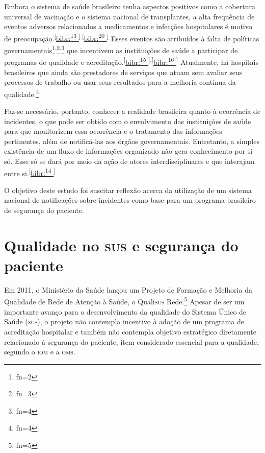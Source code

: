\documentclass{article}
\makeatletter
\newcommand{\fn}{\afterassignment\fn@aux\count0=}
\newcommand{\fn@aux}{\csname fn\the\count0\endcsname}
\makeatother
\begin{document}
Embora o sistema de saúde brasileiro tenha aspectos positivos como a cobertura
universal de
vacinação e o sistema nacional de transplantes, a alta frequência de eventos
adversos
relacionados a medicamentos e infecções hospitalares é motivo de preocupação.\textsuperscript{[}\hyperlink{\textsuperscript{13}
}{bibr:\textsuperscript{13}
}\textsuperscript{]}\textsuperscript{,}\textsuperscript{[}\hyperlink{\textsuperscript{20}
}{bibr:\textsuperscript{20}
}\textsuperscript{]}
Esses eventos são atribuídos à falta de políticas governamentais\footnote{\fn2}\textsuperscript{,}\footnote{\fn3}\textsuperscript{,}\footnote{\fn4}
que incentivem as instituições de saúde a participar de programas de qualidade e
acreditação.\textsuperscript{[}\hyperlink{\textsuperscript{15}
}{bibr:\textsuperscript{15}
}\textsuperscript{]}\textsuperscript{,}\textsuperscript{[}\hyperlink{\textsuperscript{16}
}{bibr:\textsuperscript{16}
}\textsuperscript{]}
Atualmente, há hospitais brasileiros que ainda são prestadores de serviços que
atuam
sem avaliar seus processos de trabalho ou usar seus resultados para a melhoria
contínua da
qualidade.\footnote{\fn4}

Faz-se necessário, portanto, conhecer a realidade brasileira quanto à ocorrência
de
incidentes, o que pode ser obtido com o envolvimento das instituições de saúde
para que
monitorizem essa ocorrência e o tratamento das informações pertinentes, além de
notificá-las
aos órgãos governamentais. Entretanto, a simples existência de um fluxo de
informações
organizado não gera conhecimento por si só. Esse só se dará por meio da ação de
atores
interdisciplinares e que interajam entre si.\textsuperscript{[}\hyperlink{\textsuperscript{14}
}{bibr:\textsuperscript{14}
}\textsuperscript{]}

O objetivo deste estudo foi suscitar reflexão acerca da utilização de um sistema
nacional
de notificações sobre incidentes como base para um programa brasileiro de
segurança do
paciente.

\section{Qualidade no \textsc{sus} e segurança do paciente}

Em 2011, o Ministério da Saúde lançou um Projeto de Formação e Melhoria da
Qualidade de
Rede de Atenção à Saúde, o Quali\textsc{sus} Rede.\footnote{\fn5}
Apesar de ser um importante avanço para o desenvolvimento da qualidade do
Sistema
Único de Saúde (\textsc{sus}), o projeto não contempla incentivo à adoção de um programa
de
acreditação hospitalar e também não contempla objetivo estratégico diretamente
relacionado à
segurança do paciente, item considerado essencial para a qualidade, segundo o
\textsc{iom} e a
\textsc{oms}.
\end{document}
